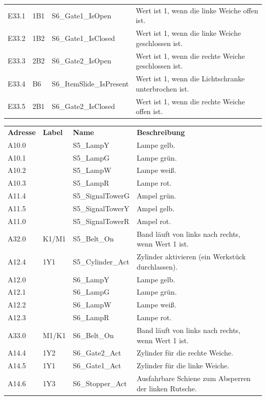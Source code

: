 \documentclass[11pt,a4paper,ngerman]{article}
\begin{document}
\begin{center}
\begin{tabularx}{\textwidth}{|p{1.5cm}|p{1cm}|p{4cm}|X|}
		E33.1  & 1B1 & S6\_Gate1\_IsOpen & Wert ist 1, wenn die linke Weiche offen ist.\\
		E33.2  & 1B2 & S6\_Gate1\_IsClosed & Wert ist 1, wenn die linke Weiche geschlossen ist.\\
		E33.3  & 2B2 & S6\_Gate2\_IsOpen & Wert ist 1, wenn die rechte Weiche geschlossen ist.\\
		E33.4  & B6  & S6\_ItemSlide\_IsPresent & Wert ist 1, wenn die Lichtschranke unterbrochen ist.\\
		E33.5  & 2B1 & S6\_Gate2\_IsClosed & Wert ist 1, wenn die rechte Weiche offen ist.\\
		\hline
	\end{tabularx}
	
	\medskip
	
	\begin{tabularx}{\textwidth}{|p{1.5cm}|p{1cm}|p{4cm}|X|}
		\hline
		\rowcolor{tublau}
		\multicolumn{4}{|c|}{\bf \color{white} \large Ausgänge}\\
		\hline\hline
		\rowcolor{gray!80}
		\bf Adresse & \bf Label & \bf Name & \bf Beschreibung \\
		\hline\hline
		A10.0 &       & S5\_LampY & Lampe gelb.\\
		A10.1 &       & S5\_LampG & Lampe grün.\\
		A10.2 &       & S5\_LampW & Lampe weiß.\\
		A10.3 &       & S5\_LampR & Lampe rot.\\
		A11.4 &       & S5\_SignalTowerG & Ampel grün.\\
		A11.5 &       & S5\_SignalTowerY & Ampel gelb.\\
		A11.0 &       & S5\_SignalTowerR & Ampel rot.\\
		A32.0 & K1/M1 & S5\_Belt\_On & Band läuft von links nach rechts, wenn Wert 1 ist.\\
		A12.4 & 1Y1   & S5\_Cylinder\_Act & Zylinder aktivieren (ein Werkstück durchlassen).\\
		\hline
		A12.0 &       & S6\_LampY & Lampe gelb.\\
		A12.1 &       & S6\_LampG & Lampe grün.\\
		A12.2 &       & S6\_LampW & Lampe weiß.\\
		A12.3 &       & S6\_LampR & Lampe rot.\\
		A33.0 & M1/K1 & S6\_Belt\_On & Band läuft von links nach rechts, wenn Wert 1 ist.\\
		A14.4 & 1Y2   & S6\_Gate2\_Act & Zylinder für die rechte Weiche.\\
		A14.5 & 1Y1   & S6\_Gate1\_Act & Zylinder für die linke Weiche.\\
		A14.6 & 1Y3   & S6\_Stopper\_Act & Ausfahrbare Schiene zum Absperren der linken Rutsche.\\
		\hline
	\end{tabularx}
\end{center}
\end{document}
